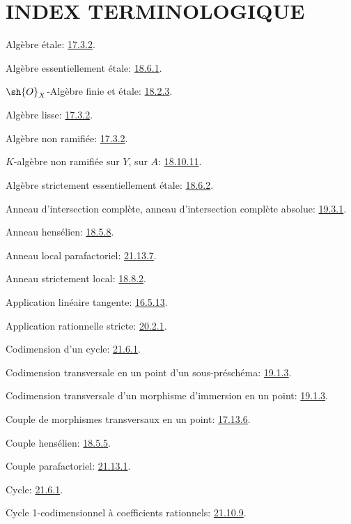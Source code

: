 \clearpage
{}
{}
\section*{INDEX TERMINOLOGIQUE}

\begingroup
\small
\setlength{\parindent}{0pt}
\setlength{\parskip}{2pt}
\newcommand{\EGAIVterm}[2]{#1: #2.\par}
\newcommand{\EGAIVidxref}[1]{\hyperref[IV.#1]{#1}}

\EGAIVterm{Algèbre étale}{{\hyperlink{ega4.c04.subsec.17-3-2}{17.3.2}}}
\EGAIVterm{Algèbre essentiellement étale}{{\hyperlink{ega4.c04.statement.18-6-1}{18.6.1}}}
\EGAIVterm{$\sh{O}_X$-Algèbre finie et étale}{{\hyperlink{ega4.c04.prop.18-2-3}{18.2.3}}}
\EGAIVterm{Algèbre lisse}{{\hyperlink{ega4.c04.subsec.17-3-2}{17.3.2}}}
\EGAIVterm{Algèbre non ramifiée}{{\hyperlink{ega4.c04.subsec.17-3-2}{17.3.2}}}
\EGAIVterm{$K$-algèbre non ramifiée sur $Y$, sur $A$}{{\hyperlink{ega4.c04.rem.18-10-11}{18.10.11}}}
\EGAIVterm{Algèbre strictement essentiellement étale}{{\hyperlink{ega4.c04.lem.18-6-2}{18.6.2}}}
\EGAIVterm{Anneau d'intersection complète, anneau d'intersection complète absolue}{{\hyperlink{ega4.c04.def.19-3-1}{19.3.1}}}
\EGAIVterm{Anneau hensélien}{{\hyperlink{ega4.c04.def.18-5-8}{18.5.8}}}
\EGAIVterm{Anneau local parafactoriel}{{\hyperlink{ega4.c04.def.21-13-7}{21.13.7}}}
\EGAIVterm{Anneau strictement local}{{\hyperlink{ega4.c04.def.18-8-2}{18.8.2}}}
\EGAIVterm{Application linéaire tangente}{{\hyperlink{ega4.c04.statement.16-5-13}{16.5.13}}}
\EGAIVterm{Application rationnelle stricte}{{\hyperlink{ega4.c04.statement.20-2-1}{20.2.1}}}
\EGAIVterm{Codimension d'un cycle}{{\hyperlink{ega4.c04.statement.21-6-1}{21.6.1}}}
\EGAIVterm{Codimension transversale en un point d'un sous-préschéma}{{\hyperlink{ega4.c04.def.19-1-3}{19.1.3}}}
\EGAIVterm{Codimension transversale d'un morphisme d'immersion en un point}{{\hyperlink{ega4.c04.def.19-1-3}{19.1.3}}}
\EGAIVterm{Couple de morphismes transversaux en un point}{{\hyperlink{ega4.c04.cor.17-13-6}{17.13.6}}}
\EGAIVterm{Couple hensélien}{{\hyperlink{ega4.c04.def.18-5-5}{18.5.5}}}
\EGAIVterm{Couple parafactoriel}{{\hyperlink{ega4.c04.def.21-13-1}{21.13.1}}}
\EGAIVterm{Cycle}{{\hyperlink{ega4.c04.statement.21-6-1}{21.6.1}}}
\EGAIVterm{Cycle 1-codimensionnel à coefficients rationnels}{{\hyperlink{ega4.c04.statement.21-10-9}{21.10.9}}}
